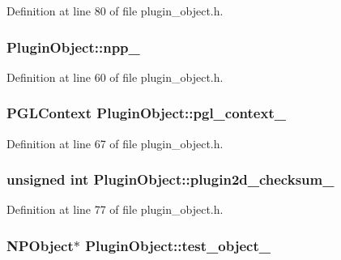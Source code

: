 Definition at line 80 of file plugin\_\-object.h.

\hypertarget{class_plugin_object_a73abf33dbc703aaab8c133b4fc16a6f4}{
\subsubsection[{npp\_\-}]{ {\bf PluginObject::npp\_\-}}}
\label{class_plugin_object_a73abf33dbc703aaab8c133b4fc16a6f4}


Definition at line 60 of file plugin\_\-object.h.

\hypertarget{class_plugin_object_a3819f8c68ea54fa3717c1487e288ee88}{
\subsubsection[{pgl\_\-context\_\-}]{\setlength{\rightskip}{0pt plus 5cm}PGLContext {\bf PluginObject::pgl\_\-context\_\-}}}
\label{class_plugin_object_a3819f8c68ea54fa3717c1487e288ee88}


Definition at line 67 of file plugin\_\-object.h.

\hypertarget{class_plugin_object_a1efe762777df7a3fc4b879d723598ef7}{
\subsubsection[{plugin2d\_\-checksum\_\-}]{\setlength{\rightskip}{0pt plus 5cm}unsigned int {\bf PluginObject::plugin2d\_\-checksum\_\-}}}
\label{class_plugin_object_a1efe762777df7a3fc4b879d723598ef7}


Definition at line 77 of file plugin\_\-object.h.

\hypertarget{class_plugin_object_aa643ef173ea31331094fbf809d87b70d}{
\subsubsection[{test\_\-object\_\-}]{\setlength{\rightskip}{0pt plus 5cm}NPObject$\ast$ {\bf PluginObject::test\_\-object\_\-}}}
\label{class_plugin_object_aa643ef173ea31331094fbf809d87b70d}


